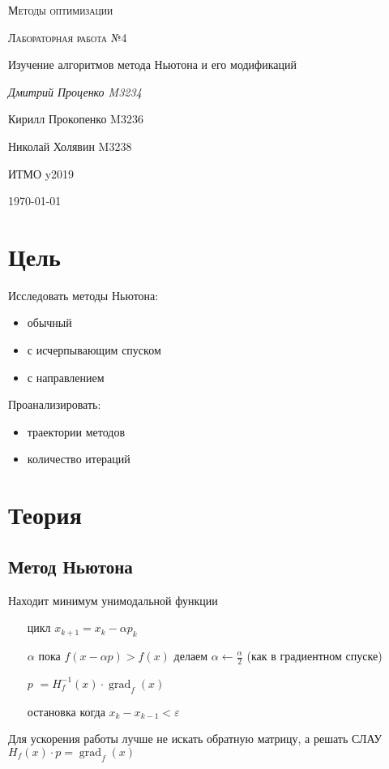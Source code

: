 \documentclass[russian, english]{article}
\begin{document}
\begin{titlepage}
\centering
	{\scshape\LARGE Методы оптимизации \par}
	\vspace{1cm}
	{\scshape\Large Лабораторная работа №4\par Изучение алгоритмов метода Ньютона и его модификаций\par}
	\vspace{2cm}
	{\Large\itshape Дмитрий Проценко M3234 \par
	Кирилл Прокопенко M3236 \par
	Николай Холявин M3238 \par}
	\vfill
	ИТМО y2019
	\vfill
	{\large \today\par}
\end{titlepage}

\tableofcontents
\newpage

\section{Цель}
Исследовать методы Ньютона:
\begin{itemize}
	\item обычный
	\item с исчерпывающим спуском
	\item с направлением
\end{itemize}
Проанализировать:
\begin{itemize}
	\item траектории методов
	\item количество итераций
\end{itemize}

\section{Теория}
\subsection{Метод Ньютона}
Находит минимум унимодальной функции
\begin{itemize}
	\item[цикл] $x_{k+1} = x_{k} - \alpha p_{k}$
	\item[$\alpha$] пока $f(x - \alpha p) > f(x)$ делаем $\alpha\leftarrow \frac{\alpha}{2}$ (как в градиентном спуске)
	\item[$p$] $= H_f^{-1}(x)\cdot\operatorname{grad}_f(x)$
	\item[остановка] когда $x_k - x_{k - 1} < \varepsilon$
\end{itemize}
Для ускорения работы лучше не искать обратную матрицу, а решать СЛАУ $H_f(x)\cdot p=\operatorname{grad}_f(x)$
\end{document}
